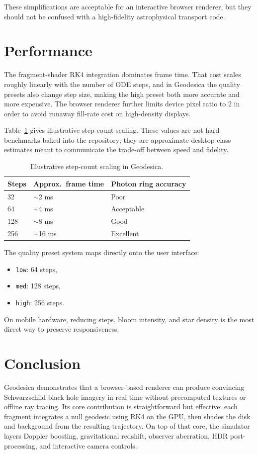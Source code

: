 \documentclass[12pt]{article}
\begin{document}
These simplifications are acceptable for an interactive browser renderer, but they should not be confused with a high-fidelity astrophysical transport code.

\section{Performance}
The fragment-shader RK4 integration dominates frame time. That cost scales roughly linearly with the number of ODE steps, and in Geodesica the quality presets also change step size, making the high preset both more accurate and more expensive. The browser renderer further limits device pixel ratio to 2 in order to avoid runaway fill-rate cost on high-density displays.

Table~\ref{tab:performance} gives illustrative step-count scaling. These values are not hard benchmarks baked into the repository; they are approximate desktop-class estimates meant to communicate the trade-off between speed and fidelity.

\begin{table}[htbp]
\centering
\caption{Illustrative step-count scaling in Geodesica.}
\label{tab:performance}
\begin{tabular}{@{}lll@{}}
\toprule
Steps & Approx.\ frame time & Photon ring accuracy \\
\midrule
32  & $\sim$2 ms  & Poor \\
64  & $\sim$4 ms  & Acceptable \\
128 & $\sim$8 ms  & Good \\
256 & $\sim$16 ms & Excellent \\
\bottomrule
\end{tabular}
\end{table}

The quality preset system maps directly onto the user interface:
\begin{itemize}
\item \texttt{low}: 64 steps,
\item \texttt{med}: 128 steps,
\item \texttt{high}: 256 steps.
\end{itemize}
On mobile hardware, reducing steps, bloom intensity, and star density is the most direct way to preserve responsiveness.

\section{Conclusion}
Geodesica demonstrates that a browser-based renderer can produce convincing Schwarzschild black hole imagery in real time without precomputed textures or offline ray tracing. Its core contribution is straightforward but effective: each fragment integrates a null geodesic using RK4 on the GPU, then shades the disk and background from the resulting trajectory. On top of that core, the simulator layers Doppler boosting, gravitational redshift, observer aberration, HDR post-processing, and interactive camera controls.
\end{document}
